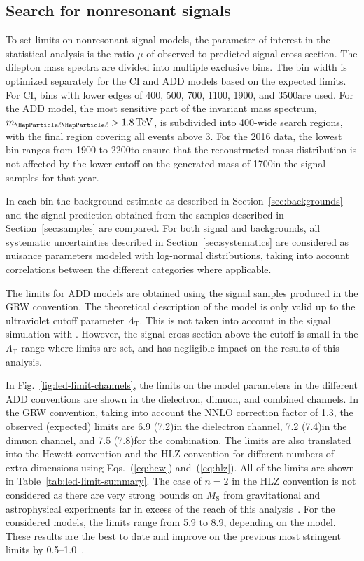\documentclass[11pt,twoside,a4paper,cmspaper,final,collab]{cms-tdr}
\begin{document}
\subsection{Search for nonresonant signals}
\label{sec:nonreslimits}
To set limits on nonresonant signal models, the parameter of interest in the statistical analysis is the
ratio $\mu$ of observed to predicted signal cross section. The dilepton mass spectra are divided into multiple exclusive bins. The bin width is optimized separately for the CI and ADD models based on the expected limits. For CI, bins with lower edges of 400, 500, 700, 1100, 1900, and 3500\GeV are used. For the ADD model,  the most sensitive part of the invariant mass spectrum, $\mll>1.8\TeV$, is subdivided into 400\GeV-wide search regions, with the final region covering all events above 3\TeV.  For the 2016 data, the lowest bin ranges from 1900 to 2200\GeV to ensure that the reconstructed mass distribution is not affected by the lower cutoff on the generated mass of 1700\GeV in the signal samples for that year. 

In each bin the background estimate as described in Section~\ref{sec:backgrounds} and the signal prediction obtained from the samples described in Section~\ref{sec:samples} are compared. For both signal and backgrounds, all systematic uncertainties described in Section~\ref{sec:systematics} are considered as nuisance parameters modeled with log-normal distributions, taking into account correlations between the different categories where applicable. 

The limits for ADD models are obtained using the signal samples produced in the GRW convention. The theoretical description of the model is only valid up to the ultraviolet cutoff parameter $\Lambda_{\mathrm{T}}$. This is not taken into account in the signal simulation with \PYTHIA. However, the signal cross section above the cutoff is small in the $\Lambda_{\mathrm{T}}$ range where limits are set, and has negligible impact on the results of this analysis. 

In Fig.~\ref{fig:led-limit-channels}, the limits on the model parameters in the different ADD conventions are shown in the dielectron, dimuon, and combined channels. In the GRW convention, taking into account the NNLO correction factor of 1.3, the observed (expected) limits are 6.9 (7.2)\TeV in the dielectron channel, 7.2 (7.4)\TeV in the dimuon channel, and 7.5 (7.8)\TeV for the combination. The limits are also translated into the Hewett convention and the HLZ convention for different numbers of extra dimensions using Eqs.~(\ref{eq:hew}) and~(\ref{eq:hlz}). All of the limits are shown in Table~\ref{tab:led-limit-summary}.  The case of $n=2$ in the HLZ convention is not considered as there are very strong bounds on $M_{\mathrm{S}}$ from gravitational and astrophysical experiments far in excess of the reach of this analysis~\cite{Torsion,Hannestad:2003yd}. For the considered models, the limits range from 5.9 to 8.9\TeV, depending on the model. These results are the best to date and improve on the previous most stringent limits by 0.5--1.0\TeV~\cite{Sirunyan:2018ipj}. 
\end{document}
